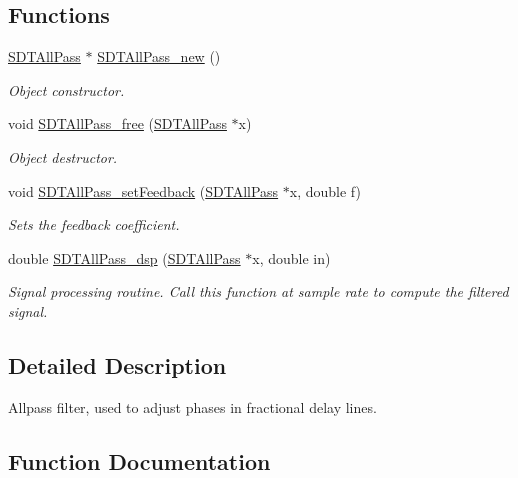 \subsection*{Functions}
\begin{DoxyCompactItemize}
\item 
\hyperlink{group__allpass_gaf7204b2111eb2234dc0c510955013960}{S\+D\+T\+All\+Pass} $\ast$ \hyperlink{group__allpass_gabb468282b9800c1cf9d010d8c7e617d0}{S\+D\+T\+All\+Pass\+\_\+new} ()
\begin{DoxyCompactList}\small\item\em Object constructor. \end{DoxyCompactList}\item 
void \hyperlink{group__allpass_ga6e6304c9636c0f8be12079e3e58958b7}{S\+D\+T\+All\+Pass\+\_\+free} (\hyperlink{group__allpass_gaf7204b2111eb2234dc0c510955013960}{S\+D\+T\+All\+Pass} $\ast$x)
\begin{DoxyCompactList}\small\item\em Object destructor. \end{DoxyCompactList}\item 
void \hyperlink{group__allpass_ga2fbffd0e09a0d97024a1f8609db04d04}{S\+D\+T\+All\+Pass\+\_\+set\+Feedback} (\hyperlink{group__allpass_gaf7204b2111eb2234dc0c510955013960}{S\+D\+T\+All\+Pass} $\ast$x, double f)
\begin{DoxyCompactList}\small\item\em Sets the feedback coefficient. \end{DoxyCompactList}\item 
double \hyperlink{group__allpass_gaf81b61028bbcf05de50828a6ff528800}{S\+D\+T\+All\+Pass\+\_\+dsp} (\hyperlink{group__allpass_gaf7204b2111eb2234dc0c510955013960}{S\+D\+T\+All\+Pass} $\ast$x, double in)
\begin{DoxyCompactList}\small\item\em Signal processing routine. Call this function at sample rate to compute the filtered signal. \end{DoxyCompactList}\end{DoxyCompactItemize}


\subsection{Detailed Description}
Allpass filter, used to adjust phases in fractional delay lines. 

\subsection{Function Documentation}
\hypertarget{group__allpass_gaf81b61028bbcf05de50828a6ff528800}{}
